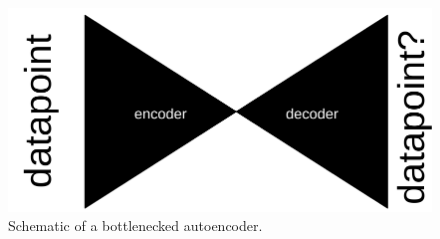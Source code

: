\begin{figure}
  \includegraphics[width=0.5\linewidth]{img/bottleneck}
  \caption{Schematic of a bottlenecked autoencoder.}
  \label{fig:bottleneck}
\end{figure}
